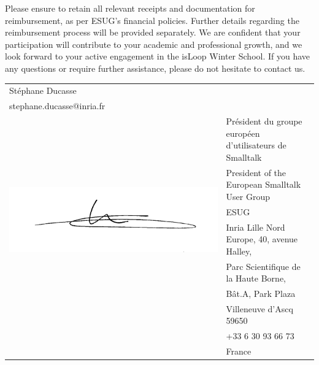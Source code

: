 \documentclass[parskip=full*,fontsize=10pt,BCOR=0pt,DIV=15]{scrreprt}
\begin{document}
Please ensure to retain all relevant receipts and documentation for reimbursement, as per ESUG’s
financial policies. Further details regarding the reimbursement process will be provided separately.
We are confident that your participation will contribute to your academic and professional growth,
and we look forward to your active engagement in the isLoop Winter School.
If you have any questions or require further assistance, please do not hesitate to contact us.


\begin{tabular}{ll}
  St\'ephane Ducasse & \\
  stephane.ducasse@inria.fr&\\

  \multirow{7}{.5\textwidth}{\includegraphics[width=.5\textwidth]{signature}} & Pr\'esident du groupe europ\'een d'utilisateurs de Smalltalk \\
& President of  the European Smalltalk User Group\\
&  ESUG \\
&  Inria Lille Nord Europe, 40, avenue Halley,\\
&  Parc Scientifique de la Haute Borne,\\
&   Bât.A, Park Plaza\\
&  Villeneuve d'Ascq  59650\\
&  +33 6 30 93 66 73\\
&  France
\end{tabular}
\end{document}

